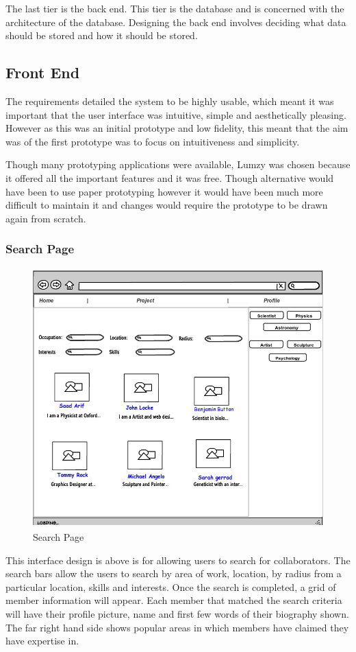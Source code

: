 \documentclass[a4paper,oneside,11pt]{report}
\begin{document}
The last tier is the back end. This tier is the database and is concerned with the architecture of the database. Designing the back end involves deciding what data should be stored and how it should be stored.
\subsection{Front End}
The requirements detailed the system to be highly usable, which meant it was important that the user interface was intuitive, simple and aesthetically pleasing. However as this was an initial prototype and low fidelity, this meant that the aim was of the first prototype was to focus on intuitiveness and simplicity.

Though many prototyping applications were available, Lumzy was chosen because it offered all the important features and it was free. Though alternative would have been to use paper prototyping however it would have been much more difficult to maintain it and changes would require the prototype to be drawn again from scratch.

\pagebreak
\subsubsection{Search Page}
\begin{figure}[!ht]
\centering
\includegraphics[width=\textwidth,height=10cm]{People.jpg}
\caption{Search Page}
\end{figure}
This interface design is above is for allowing users to search for collaborators. The search bars allow the users to search by area of work, location, by radius from a particular location, skills and interests.
Once the search is completed, a grid of member information will appear. Each member that matched the search criteria will have their profile picture, name and first few words of their biography shown. The far right hand side shows popular areas in which members have claimed they have expertise in.
\end{document}
